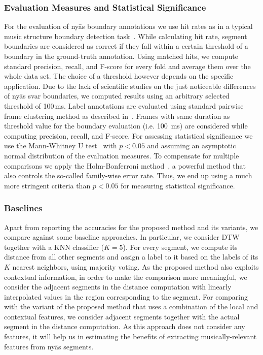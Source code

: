 \subsubsection{Evaluation Measures and Statistical Significance}

For the evaluation of ny\={a}s boundary annotations we use hit rates as in a typical music structure boundary detection task~\cite{Ong05ICMC}. While calculating hit rate, segment boundaries are considered as correct if they fall within a certain threshold of a boundary in the ground-truth annotation. Using matched hits, we compute standard precision, recall, and F-score for every fold and average them over the whole data set. The choice of a threshold however depends on the specific application. Due to the lack of scientific studies on the just noticeable differences of ny\={a}s svar boundaries, we computed results using an arbitrary selected threshold of 100\,ms. Label annotations are evaluated using standard pairwise frame clustering method as described in~\cite{levy2008structural}. Frames with same duration as threshold value for the boundary evaluation (i.e. 100~ms) are considered while computing precision, recall, and F-score. For assessing statistical significance we use the Mann-Whitney U test~\cite{mann1947test} with $p<0.05$ and assuming an asymptotic normal distribution of the evaluation measures. To compensate for multiple comparisons we apply the Holm-Bonferroni method~\cite{holm1979simple}, a powerful method that also controls the so-called family-wise error rate. Thus, we end up using a much more stringent criteria than $p<0.05$ for measuring statistical significance.

\subsubsection{Baselines}

Apart from reporting the accuracies for the proposed method and its variants, we compare against some baseline approaches. In particular, we consider DTW together with a KNN classifier ($K=5$). For every segment, we compute its distance from all other segments and assign a label to it based on the labels of its $K$ nearest neighbors, using majority voting. As the proposed method also exploits contextual information, in order to make the comparison more meaningful, we consider the adjacent segments in the distance computation with linearly interpolated values in the region corresponding to the segment. For comparing with the variant of the proposed method that uses a combination of the local and contextual features, we consider adjacent segments together with the actual segment in the distance computation. As this approach does not consider any features, it will help us in estimating the benefits of extracting musically-relevant features from ny\={a}s segments. 

